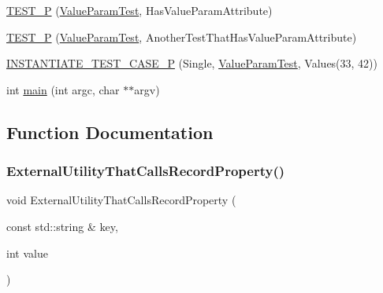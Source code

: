 \begin{DoxyCompactItemize}
\item 
\mbox{\hyperlink{_obj__test_2lib_2googletest-release-1_88_81_2googletest_2test_2gtest__xml__output__unittest___8cc_a615039c123426f44437f6119fce3333f}{T\+E\+S\+T\+\_\+P}} (\mbox{\hyperlink{class_value_param_test}{Value\+Param\+Test}}, Has\+Value\+Param\+Attribute)
\item 
\mbox{\hyperlink{_obj__test_2lib_2googletest-release-1_88_81_2googletest_2test_2gtest__xml__output__unittest___8cc_a45f95818a41865db8e0209f3f536fab0}{T\+E\+S\+T\+\_\+P}} (\mbox{\hyperlink{class_value_param_test}{Value\+Param\+Test}}, Another\+Test\+That\+Has\+Value\+Param\+Attribute)
\item 
\mbox{\hyperlink{_obj__test_2lib_2googletest-release-1_88_81_2googletest_2test_2gtest__xml__output__unittest___8cc_a6f0556593693ceebb2d31ff96025cebb}{I\+N\+S\+T\+A\+N\+T\+I\+A\+T\+E\+\_\+\+T\+E\+S\+T\+\_\+\+C\+A\+S\+E\+\_\+P}} (Single, \mbox{\hyperlink{class_value_param_test}{Value\+Param\+Test}}, Values(33, 42))
\item 
int \mbox{\hyperlink{_obj__test_2lib_2googletest-release-1_88_81_2googletest_2test_2gtest__xml__output__unittest___8cc_a3c04138a5bfe5d72780bb7e82a18e627}{main}} (int argc, char $\ast$$\ast$argv)
\end{DoxyCompactItemize}


\subsection{Function Documentation}
\mbox{\label{_obj__test_2lib_2googletest-release-1_88_81_2googletest_2test_2gtest__xml__output__unittest___8cc_a8a5eb3769c1d7482bf69f3a03862c6a6}} 
\subsubsection{\texorpdfstring{ExternalUtilityThatCallsRecordProperty()}{ExternalUtilityThatCallsRecordProperty()}\hspace{0.1cm}{\footnotesize\ttfamily [1/2]}}
{\footnotesize\ttfamily void External\+Utility\+That\+Calls\+Record\+Property (\begin{DoxyParamCaption}\item[{const std\+::string \&}]{key,  }\item[{int}]{value }\end{DoxyParamCaption})}


